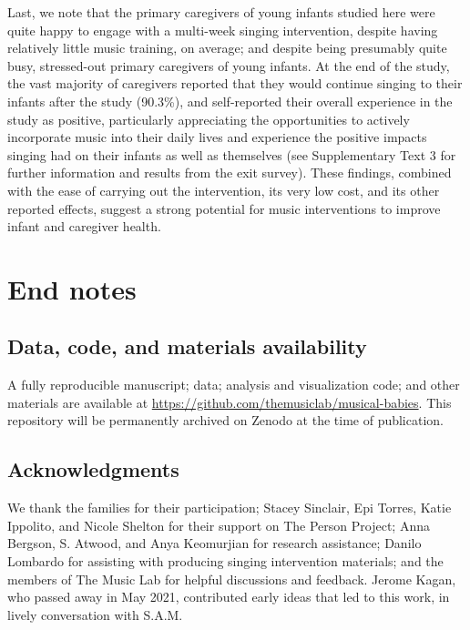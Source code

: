 \documentclass[
]{article}
\begin{document}
Last, we note that the primary caregivers of young infants studied here
were quite happy to engage with a multi-week singing intervention,
despite having relatively little music training, on average; and despite
being presumably quite busy, stressed-out primary caregivers of young
infants. At the end of the study, the vast majority of caregivers
reported that they would continue singing to their infants after the
study (90.3\%), and self-reported their overall experience in the study
as positive, particularly appreciating the opportunities to actively
incorporate music into their daily lives and experience the positive
impacts singing had on their infants as well as themselves (see
Supplementary Text 3 for further information and results from the exit
survey). These findings, combined with the ease of carrying out the
intervention, its very low cost, and its other reported effects, suggest
a strong potential for music interventions to improve infant and
caregiver health.

\clearpage

\section*{End notes}\label{end-notes}

\subsection*{Data, code, and materials
availability}\label{data-code-and-materials-availability}

A fully reproducible manuscript; data; analysis and visualization code;
and other materials are available at
\url{https://github.com/themusiclab/musical-babies}. This repository
will be permanently archived on Zenodo at the time of publication.

\subsection*{Acknowledgments}\label{acknowledgments}

We thank the families for their participation; Stacey Sinclair, Epi
Torres, Katie Ippolito, and Nicole Shelton for their support on The
Person Project; Anna Bergson, S. Atwood, and Anya Keomurjian for
research assistance; Danilo Lombardo for assisting with producing
singing intervention materials; and the members of The Music Lab for
helpful discussions and feedback. Jerome Kagan, who passed away in May
2021, contributed early ideas that led to this work, in lively
conversation with S.A.M.
\end{document}
